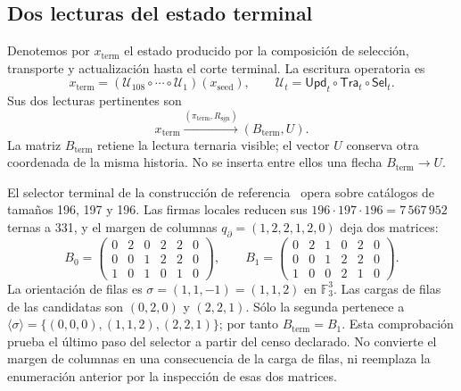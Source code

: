 

\subsection{Dos lecturas del estado terminal}
\label{subsec:k-terminal}

Denotemos por \(x_{\mathrm{term}}\) el estado producido por la composición
de selección, transporte y actualización hasta el corte terminal. La
escritura operatoria es
\[
 x_{\mathrm{term}}=
 (\mathcal U_{108}\circ\cdots\circ\mathcal U_1)(x_{\mathrm{seed}}),
 \qquad \mathcal U_t=\mathsf{Upd}_t\circ\mathsf{Tra}_t\circ\mathsf{Sel}_t.
\]
Sus dos lecturas pertinentes son
\[
 x_{\mathrm{term}}
 \xrightarrow{(\pi_{\mathrm{term}},R_{\mathrm{sgn}})}
 (B_{\mathrm{term}},U).
\]
La matriz \(B_{\mathrm{term}}\) retiene la lectura ternaria visible; el
vector \(U\) conserva otra coordenada de la misma historia. No se inserta
entre ellos una flecha \(B_{\mathrm{term}}\to U\).

El selector terminal de la construcción de referencia~\cite{hmtintegral} opera sobre catálogos
de tamaños 196, 197 y 196. Las firmas locales reducen sus
\(196\cdot197\cdot196=7\,567\,952\) ternas a 331, y el margen de
columnas \(q_{\partial}=(1,2,2,1,2,0)\) deja dos matrices:
\[
 B_0=\begin{pmatrix}0&2&0&2&2&0\\0&0&1&2&2&0\\1&0&1&0&1&0\end{pmatrix},
 \qquad
 B_1=\begin{pmatrix}0&2&1&0&2&0\\0&0&1&2&2&0\\1&0&0&2&1&0\end{pmatrix}.
\]
La orientación de filas es \(\sigma=(1,1,-1)=(1,1,2)\) en
\(\mathbb F_3^3\). Las cargas de filas de las candidatas son
\((0,2,0)\) y \((2,2,1)\). Sólo la segunda pertenece a
\(\langle\sigma\rangle=\{(0,0,0),(1,1,2),(2,2,1)\}\); por tanto
\(B_{\mathrm{term}}=B_1\). Esta comprobación prueba el último paso del
selector a partir del censo declarado. No convierte el margen de columnas
en una consecuencia de la carga de filas, ni reemplaza la enumeración
anterior por la inspección de esas dos matrices.

